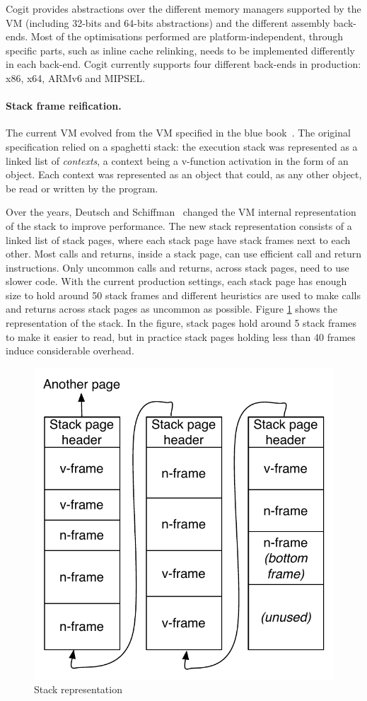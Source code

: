 \documentclass[a4paper,12pt,twoside]{../includes/ThesisStyle}
\begin{document}
Cogit provides abstractions over the different memory managers supported by the VM (including 32-bits and 64-bits abstractions) and the different assembly back-ends. Most of the optimisations performed are platform-independent, through specific parts, such as inline cache relinking, needs to be implemented differently in each back-end. Cogit currently supports four different back-ends in production: x86, x64, ARMv6 and MIPSEL.

\paragraph{Stack frame reification.}
\label{par:frameToContext}
The current VM evolved from the VM specified in the blue book~\cite{Gold83a}. The original specification relied on a spaghetti stack: the execution stack was represented as a linked list of \emph{contexts}, a context being a v-function activation in the form of an object. Each context was represented as an object that could, as any other object, be read or written by the program. 

Over the years, Deutsch and Schiffman~\cite{Deut84a} changed the VM internal representation of the stack to improve performance. The new stack representation consists of a linked list of stack pages, where each stack page have stack frames next to each other. Most calls and returns, inside a stack page, can use efficient call and return instructions. Only uncommon calls and returns, across stack pages, need to use slower code. With the current production settings, each stack page has enough size to hold around 50 stack frames and different heuristics are used to make calls and returns across stack pages as uncommon as possible. Figure \ref{fig:StackRepresentation} shows the representation of the stack. In the figure, stack pages hold around 5 stack frames to make it easier to read, but in practice stack pages holding less than 40 frames induce considerable overhead.

\begin{figure}[h!]
    \begin{center}
        \includegraphics[width=0.52\linewidth]{StackRepresentation}
        \caption{Stack representation}
        \label{fig:StackRepresentation}
    \end{center}
\end{figure}
\end{document}

